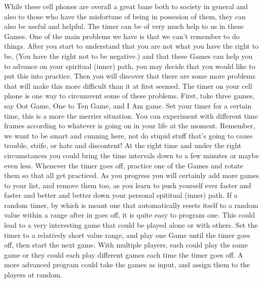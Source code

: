 \documentclass[12pt,letterpaper]{book}
\begin{document}
While these cell phones are overall a great bane both to society in general and also to those who have the misfortune of being in possesion of them, they can also be useful and helpful. The timer can be of very much help to us in these Games. One of the main problems we have is that we can't remember to do things. After you start to understand that you are not what you have the right to be, (You have the right not to be negative.) and that these Games can help you to advance on your spiritual (inner) path, you may decide that you would like to put this into practice. Then you will discover that there are some more problems that will make this more difficult than it at first seemed. The timer on your cell phone is one way to circumvent some of these problems. First, take three games, say Oot Game, One to Ten Game, and I Am game. Set your timer for a certain time, this is a more the merrier situation. You can experiment with different time frames according to whatever is going on in your life at the moment. Remember, we want to be smart and cunning here, not do stupid stuff that's going to cause trouble, strife, or hate and discontent! At the right time and under the right circumstances you could bring the time intervals down to a few minutes or maybe even less. Whenever the timer goes off, practice one of the Games and rotate them so that all get practiced. As you progress you will certainly add more games to your list, and remove them too, as you learn to push yourself ever faster and faster and better and better down your personal spititual (inner) path. If a random timer, by which is meant one that automatically resets itself to a random value within a range after in goes off, it is quite easy to program one. This could lead to a very interesting game that could be played alone or with others. Set the timer to a relatively short value range, and play one Game until the timer goes off, then start the next game. With multiple players, each could play the same game or they could each play different games each time the timer goes off. A more advanced program could take the games as input, and assign them to the players at random.
\end{document}
